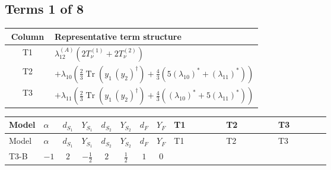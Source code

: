 \documentclass[8pt]{article}
\begin{document}
\begin{landscape}
\subsection*{Terms 1 of 8}
\begin{center}
\begin{tabular}{@{}c >{\raggedright\arraybackslash}p{0.82\linewidth}@{}}
\toprule
Column & Representative term structure \\
\midrule
T1 & \(\displaystyle {\lambda_{12}^{(A)}} (2 T_{\nu}^{(1)}+2 T_{\nu}^{(2)})\) \\
\midrule
T2 & \(\displaystyle +{\lambda_{10}} \left(\frac{2}{3} \operatorname{Tr}\!\left({y_1}\,\left({y_2}\right)^{\dagger}\right)+\frac{4}{3} (5 \left({\lambda_{10}}\right)^{*}+\left({\lambda_{11}}\right)^{*})\right)\) \\
\midrule
T3 & \(\displaystyle +{\lambda_{11}} \left(\frac{2}{3} \operatorname{Tr}\!\left({y_1}\,\left({y_2}\right)^{\dagger}\right)+\frac{4}{3} (\left({\lambda_{10}}\right)^{*}+5 \left({\lambda_{11}}\right)^{*})\right)\) \\
\midrule
\bottomrule
\end{tabular}
\end{center}
\smallskip
\tiny
\begin{longtable}{@{}llcccccc >{\raggedright\arraybackslash}p{0.21\linewidth} >{\raggedright\arraybackslash}p{0.21\linewidth} >{\raggedright\arraybackslash}p{0.21\linewidth}@{}}
\toprule
Model & $\alpha$ & $d_{S_1}$ & $Y_{S_1}$ & $d_{S_2}$ & $Y_{S_2}$ & $d_F$ & $Y_F$ & T1 & T2 & T3 \\
\midrule
\endfirsthead
\toprule
Model & $\alpha$ & $d_{S_1}$ & $Y_{S_1}$ & $d_{S_2}$ & $Y_{S_2}$ & $d_F$ & $Y_F$ & T1 & T2 & T3 \\
\midrule
\endhead
T3-B & $-1$ & $2$ & $-\frac{1}{2}$ & $2$ & $\frac{1}{2}$ & $1$ & $0$ & \scriptsize\adjustbox{max width=\linewidth}{$\begin{gathered} {\lambda_{12}^{(A)}} (2 T_{\nu}^{(1)}+2 T_{\nu}^{(2)})\end{gathered}$} & \scriptsize\adjustbox{max width=\linewidth}{$\begin{gathered} +{\lambda_{10}} \left(\frac{2}{3} \operatorname{Tr}\!\left({y_1}\,\left({y_2}\right)^{\dagger}\right)+\frac{4}{3} (5 \left({\lambda_{10}}\right)^{*}+\left({\lambda_{11}}\right)^{*})\right)\end{gathered}$} & \scriptsize\adjustbox{max width=\linewidth}{$\begin{gathered} +{\lambda_{11}} \left(\frac{2}{3} \operatorname{Tr}\!\left({y_1}\,\left({y_2}\right)^{\dagger}\right)+\frac{4}{3} (\left({\lambda_{10}}\right)^{*}+5 \left({\lambda_{11}}\right)^{*})\right)\end{gathered}$} \\

\end{longtable}
\end{landscape}
\end{document}

